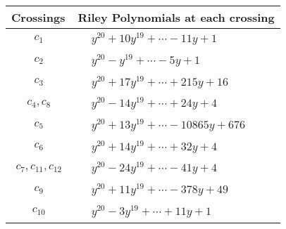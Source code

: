 \documentclass[1p]{elsarticle_modified}
\theoremstyle{definition}
\begin{document}
\begin{tabular}{m{50pt}|m{274pt}}
Crossings & \hspace{64pt}Riley Polynomials at each crossing \\
\hline $$\begin{aligned}c_{1}\end{aligned}$$&$\begin{aligned}
&y^{20}+10 y^{19}+\cdots-11 y+1
\end{aligned}$\\
\hline $$\begin{aligned}c_{2}\end{aligned}$$&$\begin{aligned}
&y^{20}- y^{19}+\cdots-5 y+1
\end{aligned}$\\
\hline $$\begin{aligned}c_{3}\end{aligned}$$&$\begin{aligned}
&y^{20}+17 y^{19}+\cdots+215 y+16
\end{aligned}$\\
\hline $$\begin{aligned}c_{4},c_{8}\end{aligned}$$&$\begin{aligned}
&y^{20}-14 y^{19}+\cdots+24 y+4
\end{aligned}$\\
\hline $$\begin{aligned}c_{5}\end{aligned}$$&$\begin{aligned}
&y^{20}+13 y^{19}+\cdots-10865 y+676
\end{aligned}$\\
\hline $$\begin{aligned}c_{6}\end{aligned}$$&$\begin{aligned}
&y^{20}+14 y^{19}+\cdots+32 y+4
\end{aligned}$\\
\hline $$\begin{aligned}c_{7},c_{11},c_{12}\end{aligned}$$&$\begin{aligned}
&y^{20}-24 y^{19}+\cdots-41 y+4
\end{aligned}$\\
\hline $$\begin{aligned}c_{9}\end{aligned}$$&$\begin{aligned}
&y^{20}+11 y^{19}+\cdots-378 y+49
\end{aligned}$\\
\hline $$\begin{aligned}c_{10}\end{aligned}$$&$\begin{aligned}
&y^{20}-3 y^{19}+\cdots+11 y+1
\end{aligned}$\\
\hline
\end{tabular}\\~\\
\end{document}
